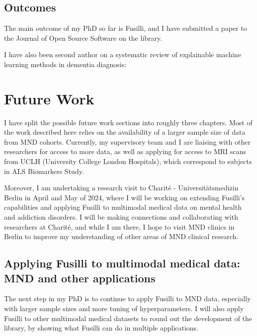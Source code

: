 \subsection{Outcomes}

The main outcome of my PhD so far is Fusilli, and I have submitted a paper to the Journal of Open Source Software on the library.


I have also been second author on a systematic review of explainable machine learning methods in dementia diagnosis:


\section{Future Work}

I have split the possible future work sections into roughly three chapters.
Most of the work described here relies on the availability of a larger sample size of data from MND cohorts.
Currently, my supervisory team and I are liaising with other researchers for access to more data, as well as applying for access to MRI scans from UCLH (University College London Hospitals), which correspond to subjects in ALS Biomarkers Study.

Moreover, I am undertaking a research visit to Charité - Universitätsmedizin Berlin in April and May of 2024, where I will be working on extending Fusilli's capabilities and applying Fusilli to multimodal medical data on mental health and addiction disorders.
I will be making connections and collaborating with researchers at Charité, and while I am there, I hope to visit MND clinics in Berlin to improve my understanding of other areas of MND clinical research.

\subsection{Applying Fusilli to multimodal medical data: MND and other applications}

The next step in my PhD is to continue to apply Fusilli to MND data, especially with larger sample sizes and more tuning of hyperparameters.
I will also apply Fusilli to other multimodal medical datasets to round out the development of the library, by showing what Fusilli can do in multiple applications.

